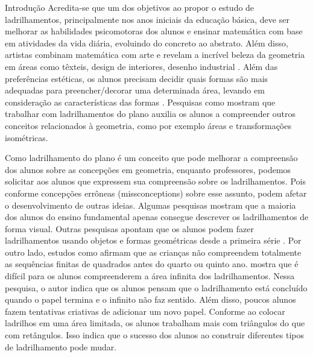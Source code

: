 \begin{apresentacao}{Introdução}
Acredita-se que um dos  objetivos ao propor o estudo de ladrilhamentos, principalmente nos anos iniciais da educação básica, deve ser melhorar as habilidades psicomotoras dos alunos e ensinar matemática com base em  atividades da vida diária, evoluindo do concreto ao abstrato. Além disso, artistas combinam matemática com arte e revelam a incrível beleza da geometria em áreas como têxteis, design de interiores, desenho industrial \citep{hatfield2000}. Além das preferências estéticas, os alunos precisam decidir quais formas são mais adequadas para preencher/decorar uma determinada área, levando em consideração as características das formas \citep{cllingham}. Pesquisas como \citet{fuys1988,serra1993,wheatley1996} mostram que trabalhar com ladrilhamentos do plano auxilia os alunos a compreender outros conceitos relacionados à geometria, como por exemplo áreas e transformações isométricas.  

Como ladrilhamento do plano é um conceito que pode melhorar a compreensão dos alunos sobre as concepções em geometria,  enquanto professores, podemos  solicitar aos alunos que expressem sua compreensão sobre os ladrilhamentos. Pois conforme \citet{cllingham} concepções errôneas (missconceptions)  sobre esse assunto, podem afetar o desenvolvimento de outras ideias. Algumas pesquisas mostram que a maioria dos alunos do ensino fundamental apenas consegue descrever os ladrilhamentos de forma visual. Outras pesquisas apontam que os alunos podem fazer ladrilhamentos  usando objetos e formas geométricas desde a primeira série \citep{eberle2014,odaffer,ward2003}. Por outro lado, estudos como \citet{outhred2000} afirmam que as crianças não compreendem totalmente as sequências finitas de quadrados antes do quarto ou quinto ano. \citet{marchini2003} mostra que é  difícil para os alunos compreenderem a área infinita dos ladrilhamentos. Nessa pesquisa, o autor indica que os alunos pensam que o ladrilhamento está concluído quando o papel termina e o infinito não faz sentido. Além disso,  poucos alunos fazem tentativas criativas de adicionar um novo papel. Conforme \citet{owens1998} ao colocar ladrilhos em uma área limitada, os alunos trabalham mais com triângulos do que com retângulos. Isso indica que o sucesso dos alunos ao construir diferentes tipos de ladrilhamento  pode mudar.


\end{apresentacao}
